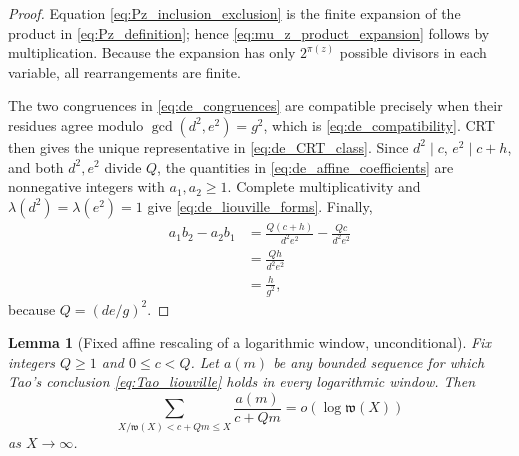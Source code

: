 \documentclass[11pt]{amsart}
\numberwithin{equation}{section}
\theoremstyle{plain}
\newtheorem{lemma}[theorem]{Lemma}
\theoremstyle{definition}
\theoremstyle{remark}
\newcommand{\liou}{\lambda}
\newcommand{\what}{\mathfrak w}
\begin{document}
\begin{proof}
Equation \eqref{eq:Pz_inclusion_exclusion} is the finite expansion of the product in \eqref{eq:Pz_definition}; hence \eqref{eq:mu_z_product_expansion} follows by multiplication.  Because the expansion has only $2^{\pi(z)}$ possible divisors in each variable, all rearrangements are finite.

The two congruences in \eqref{eq:de_congruences} are compatible precisely when their residues agree modulo $\gcd(d^2,e^2)=g^2$, which is \eqref{eq:de_compatibility}.  CRT then gives the unique representative in \eqref{eq:de_CRT_class}.  Since $d^2\mid c$, $e^2\mid c+h$, and both $d^2,e^2$ divide $Q$, the quantities in \eqref{eq:de_affine_coefficients} are nonnegative integers with $a_1,a_2\ge1$.  Complete multiplicativity and $\liou(d^2)=\liou(e^2)=1$ give \eqref{eq:de_liouville_forms}.  Finally,
\begin{align}
a_1b_2-a_2b_1
&=\frac{Q(c+h)}{d^2e^2}-\frac{Qc}{d^2e^2}
\label{eq:de_det_first}\\
&=\frac{Qh}{d^2e^2}
\label{eq:de_det_second}\\
&=\frac{h}{g^2},
\label{eq:de_det_final}
\end{align}
because $Q=(de/g)^2$.
\end{proof}

\begin{lemma}[Fixed affine rescaling of a logarithmic window, unconditional]
\label{lem:affine_log_window}
Fix integers $Q\ge1$ and $0\le c<Q$.  Let $a(m)$ be any bounded sequence for which Tao's conclusion \eqref{eq:Tao_liouville} holds in every logarithmic window.  Then
\begin{equation}
\sum_{X/\what(X)<c+Qm\le X}\frac{a(m)}{c+Qm}
=o(\log\what(X))
\label{eq:affine_window_conclusion}
\end{equation}
as $X\to\infty$.
\end{lemma}
\end{document}
